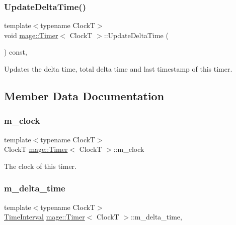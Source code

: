 \subsubsection{\texorpdfstring{Update\+Delta\+Time()}{UpdateDeltaTime()}}
{\footnotesize\ttfamily template$<$typename ClockT$>$ \\
void \hyperlink{classmage_1_1_timer}{mage\+::\+Timer}$<$ ClockT $>$\+::Update\+Delta\+Time (\begin{DoxyParamCaption}{ }\end{DoxyParamCaption}) const\hspace{0.3cm}{\ttfamily [private]}, {\ttfamily [noexcept]}}

Updates the delta time, total delta time and last timestamp of this timer. 

\subsection{Member Data Documentation}
\hypertarget{classmage_1_1_timer_ad46016090f9ae8a282398d8fcc8e9e0e}{}\label{classmage_1_1_timer_ad46016090f9ae8a282398d8fcc8e9e0e} 
\subsubsection{\texorpdfstring{m\+\_\+clock}{m\_clock}}
{\footnotesize\ttfamily template$<$typename ClockT$>$ \\
ClockT \hyperlink{classmage_1_1_timer}{mage\+::\+Timer}$<$ ClockT $>$\+::m\+\_\+clock\hspace{0.3cm}{\ttfamily [private]}}

The clock of this timer. \hypertarget{classmage_1_1_timer_a9cb9bf6cd0f567a8a1fad02a89d98aa2}{}\label{classmage_1_1_timer_a9cb9bf6cd0f567a8a1fad02a89d98aa2} 
\subsubsection{\texorpdfstring{m\+\_\+delta\+\_\+time}{m\_delta\_time}}
{\footnotesize\ttfamily template$<$typename ClockT$>$ \\
\hyperlink{classmage_1_1_timer_a5c0fd78ceab0110637622bd0e9b8424d}{Time\+Interval} \hyperlink{classmage_1_1_timer}{mage\+::\+Timer}$<$ ClockT $>$\+::m\+\_\+delta\+\_\+time\hspace{0.3cm}{\ttfamily [mutable]}, {\ttfamily [private]}}

